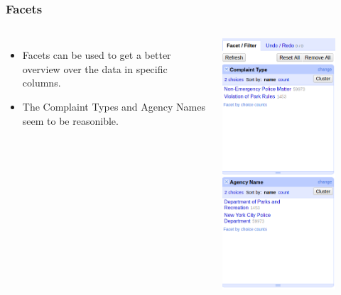 \documentclass{beamer}
\begin{document}
\begin{frame}

\frametitle{Facets}
\begin{columns}
\begin{itemize}

\item Facets can be used to get a better overview over the data in specific columns.
\vfill
\item The Complaint Types and Agency Names seem to be reasonible.

\end{itemize}
\includegraphics[width = 0.8\textwidth]{pictures/facets.png}
\end{columns}
\end{frame}
\end{document}
